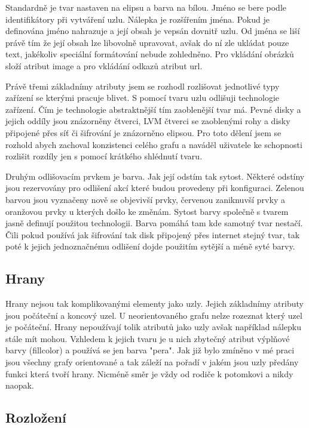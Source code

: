 \documentclass[color,table,oneside,nolot,nolof]{fithesis}
\begin{document}
	Standardně je tvar nastaven na elipsu a barva
	na bílou. Jméno se bere podle identifikátory při vytváření uzlu. Nálepka je rozšířením jména. Pokud je definována jméno nahrazuje a její obsah je vepsán dovnitř uzlu. Od jména se liší právě
	tím že její obsah lze libovolně upravovat, avšak do ní zle ukládat pouze text, jakékoliv speciální formátování nebude zohledněno. Pro vkládání obrázků složí atribut image a pro vkládání
	odkazů atribut url.

	Právě třemi základnímy atributy jsem se rozhodl rozlišovat jednotlivé typy zařízení se kterými pracuje blivet. S pomocí tvaru uzlu odlišuji technologie zařízení. Čím je technologie
	abstraktnější tím zaoblenější tvar má. Pevné disky a jejich oddíly jsou znázorněny čtverci, LVM čtverci se zaoblenými rohy a disky připojené přes síť či šifrování je znázorněno elipsou.
	Pro toto dělení jsem se rozhold abych zachoval konzistenci celého grafu a naváděl uživatele ke schopnosti rozlišit rozdíly jen s pomocí krátkého shlédnutí tvaru.

	Druhým odlišovacím prvkem je barva. Jak její odstím tak sytost. Některé odstíny jsou rezervovány pro odlišení akcí které budou provedeny při konfiguraci. Zelenou barvou jsou vyznačeny
	nově se objevivší prvky, červenou zaniknuvší prvky a oranžovou prvky u kterých došlo ke změnám. Sytost barvy společně s tvarem jasně definují použitou technologii. Barva pomáhá tam kde
	samotný tvar nestačí. Čili pokud používá jak šifrování tak disk připojený přes internet stejný tvar, tak poté k jejich jednoznačnému odlišení dojde použitím sytější a méně syté barvy.

\subsection{Hrany}
	Hrany nejsou tak komplikovanými elementy jako uzly. Jejich základnímy atributy jsou počáteční a koncový uzel. U neorientovaného grafu nelze rozeznat který uzel je počáteční. Hrany 
	nepoužívají tolik atributů jako uzly avšak například nálepku stále mít mohou. Vzhledem k jejich tvaru je u nich zbytečný atribut výplňové barvy (fillcolor) a používá se jen barva "pera".
	Jak již bylo zmíněno v mé praci jsou všechny grafy orientované a tak záleží na pořadí v jakém jsou uzly předány funkci která tvoří hrany. Nicméně směr je vždy od rodiče k potomkovi a 
	nikdy naopak.
	
\subsection{Rozložení}

	\printbibliography
\end{document}
